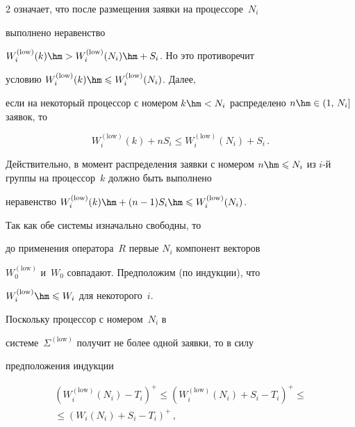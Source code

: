 \begin{multicols}{2}
означает, что после  размещения заявки на процессоре~$N_{i}$ 

выполнено неравенство

$W_{i}^{(\mathrm{low})}(k)\hm>W_{i}^{(\mathrm{low})}(N_{i})\hm+S_{i}$. Но это противоречит

условию $W_{i}^{(\mathrm{low})}(k)\hm\leqslant W_{i}^{(\mathrm{low})}(N_{i})$. Далее,

если на некоторый процессор с номером $k\hm<N_{i}$ распределено $n\hm\in

(1,\, N_{i}]$ заявок, то

    \begin{equation}

    \label{minor-ntasks}

        W_{i}^{(\mathrm{low})}(k)+nS_{i}\leqslant W_{i}^{(\mathrm{low})}(N_{i})+S_{i}\,.

    \end{equation}

Действительно, в момент распределения заявки с номером $n\hm\leqslant

N_{i}$ из $i$-й группы на процессор~$k$ должно быть выполнено

неравенство $W_{i}^{(\mathrm{low})}(k)\hm+(n-1)S_{i}\hm\leqslant

W_{i}^{(\mathrm{low})}(N_{i})$.



Так как  обе системы изначально свободны, то

до применения оператора~$R$ первые $N_{i}$ компонент векторов

$W_{0}^{(\mathrm{low})}$ и~$W_{0}$ совпадают. Предположим (по индукции), что

$W_{i}^{(\mathrm{low})}\hm\leqslant W_{i}$ для некоторого~$i$.

  Поскольку процессор с номером~$N_{i}$ в

  сис\-те\-ме~$\Sigma^{(\mathrm{low})}$ получит не более одной заявки, то в силу

предположения индукции

\begin{multline*}

(W_{i}^{(\mathrm{low})}(N_{i})-T_{i})^{+}\leqslant

(W_{i}^{(\mathrm{low})}(N_{i})+S_{i}-T_{i})^{+} \leqslant{}\\

{}\leqslant

(W_{i}(N_{i})+S_{i}-T_{i})^{+}\,,

\end{multline*}


\end{multicols}
